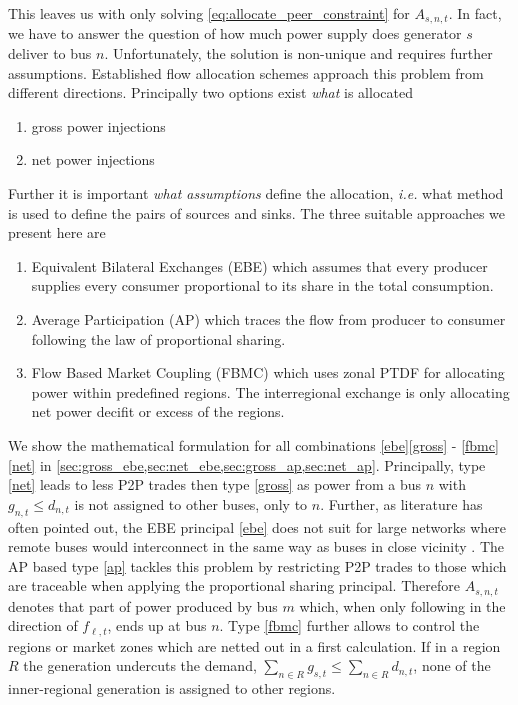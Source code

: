 \documentclass[11pt,twocolumn]{article}
\newcommand{\ie}{\textit{i.e.} }
\newcommand{\generation}{g_{s,t}}
\newcommand{\nodalgeneration}[1][n]{g_{#1,t}}
\newcommand{\flow}{f_{\ell,t}}
\newcommand{\demand}[1][n]{d_{#1,t}}
\newcommand{\nodaldemand}[1][n]{d_{#1,t}}
\newcommand{\allocatepeer}[1][s, n]{A_{#1,t}}
\begin{document}
 
This leaves us with only solving \cref{eq:allocate_peer_constraint} for $\allocatepeer$. In fact, we have to answer the question of how much power supply does generator $s$ deliver to bus $n$. Unfortunately, the solution is non-unique and requires further assumptions. Established flow allocation schemes approach this problem from different directions. Principally two options exist \textit{what} is allocated 
% 
\begin{enumerate}
\item gross power injections \label{gross}
\item net power injections \label{net}
\end{enumerate}
% 
Further it is important \textit{what assumptions} define the allocation, \ie what method is used to define the pairs of sources and sinks. The three suitable approaches we present here are
% 
\begin{enumerate}[label=\alph*., ref=\alph*]
\item Equivalent Bilateral Exchanges (EBE) \cite{galiana_transmission_2003} which assumes
that every producer supplies every consumer proportional to its share in the total consumption. \label{ebe} 
\item Average Participation (AP) \cite{bialek_tracing_1996,achayuthakan_electricity_2010-1} which traces the flow from producer to consumer following the law of proportional sharing. \label{ap}
\item Flow Based Market Coupling (FBMC) which uses zonal PTDF for allocating power within predefined regions. The interregional exchange is only allocating net power decifit or excess of the regions. \label{fbmc}
\end{enumerate}
% 
We show the mathematical formulation for all combinations \ref{ebe}\ref{gross} - \ref{fbmc}\ref{net} in \cref{sec:gross_ebe,sec:net_ebe,sec:gross_ap,sec:net_ap}.
% 
Principally, type \ref{net} leads to less P2P trades then type \ref{gross} as power from a bus $n$ with $\nodalgeneration \le \nodaldemand$ is not assigned to other buses, only to $n$. 
Further, as literature has often pointed out, the EBE principal \ref{ebe} does not suit for large networks where remote buses would interconnect in the same way as buses in close vicinity \cite{gil_multiarea_2005}. The AP based type \ref{ap} tackles this problem by restricting P2P trades to those which are traceable when applying the proportional sharing principal. Therefore $\allocatepeer$ denotes that part of power produced by bus $m$ which, when only following in the direction of $\flow$, ends up at bus $n$. Type \ref{fbmc} further allows to control the regions or market zones which are netted out in a first calculation. If in a region $R$ the generation undercuts the demand, $\sum_{n \in R} \generation \le \sum_{n \in R} \demand$, none of the inner-regional generation is assigned to other regions. 
\end{document}
